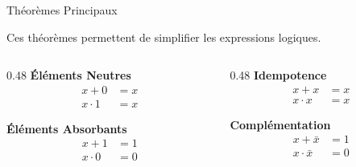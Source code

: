 \begin{frame}{Théorèmes Principaux}

    Ces théorèmes permettent de simplifier les expressions logiques.

    \vspace{0.3cm}

    \begin{columns}[T]
        \begin{column}{0.48\textwidth}
            \textbf{Éléments Neutres}
            \begin{align*}
                x + 0 &= x \\
                x \cdot 1 &= x
            \end{align*}

            \vspace{0.2cm}

            \textbf{Éléments Absorbants}
            \begin{align*}
                x + 1 &= 1 \\
                x \cdot 0 &= 0
            \end{align*}
        \end{column}

        \begin{column}{0.48\textwidth}
            \textbf{Idempotence}
            \begin{align*}
                x + x &= x \\
                x \cdot x &= x
            \end{align*}

            \vspace{0.2cm}

            \textbf{Complémentation}
            \begin{align*}
                x + \bar{x} &= 1 \\
                x \cdot \bar{x} &= 0
            \end{align*}
        \end{column}
    \end{columns}

\end{frame}

